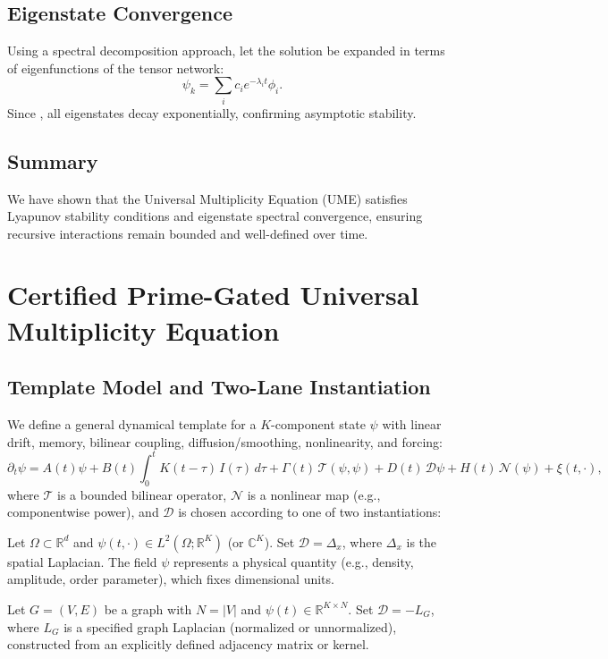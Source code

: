 \documentclass{article}
\theoremstyle{plain}
\begin{document}
\subsection{Eigenstate Convergence}
Using a spectral decomposition approach, let the solution be expanded in terms of eigenfunctions  of the tensor network:
\begin{equation}
\psi_k = \sum_i c_i e^{-\lambda_i t} \phi_i.
\end{equation}
Since , all eigenstates decay exponentially, confirming asymptotic stability.

\subsection{Summary}
We have shown that the Universal Multiplicity Equation (UME) satisfies Lyapunov stability conditions and eigenstate spectral convergence, ensuring recursive interactions remain bounded and well-defined over time.

\section{Certified Prime-Gated Universal Multiplicity Equation}

\subsection{Template Model and Two-Lane Instantiation}

We define a general dynamical template for a $K$-component state $\psi$ with linear drift, memory, bilinear coupling, diffusion/smoothing, nonlinearity, and forcing:
\begin{equation}
\partial_t \psi
= A(t)\psi
+ B(t)\int_{0}^{t}K(t-\tau)\,I(\tau)\,d\tau
+ \Gamma(t)\,\mathcal{T}(\psi,\psi)
+ D(t)\,\mathcal{D}\psi
+ H(t)\,\mathcal{N}(\psi)
+ \xi(t,\cdot),
\label{eq:template}
\end{equation}
where $\mathcal{T}$ is a bounded bilinear operator, $\mathcal{N}$ is a nonlinear map (e.g., componentwise power), and $\mathcal{D}$ is chosen according to one of two instantiations:

\begin{description}[leftmargin=2em]
\item[\textbf{Lane A (Physical PDE).}] 
Let $\Omega\subset\mathbb{R}^d$ and $\psi(t,\cdot)\in L^2(\Omega;\mathbb{R}^K)$ (or $\mathbb{C}^K$). Set $\mathcal{D}=\Delta_x$, where $\Delta_x$ is the spatial Laplacian. The field $\psi$ represents a physical quantity (e.g., density, amplitude, order parameter), which fixes dimensional units.

\item[\textbf{Lane B (Graph/ML).}] 
Let $G=(V,E)$ be a graph with $N=|V|$ and $\psi(t)\in\mathbb{R}^{K\times N}$. Set $\mathcal{D}=-L_G$, where $L_G$ is a specified graph Laplacian (normalized or unnormalized), constructed from an explicitly defined adjacency matrix or kernel.
\end{description}
\end{document}
